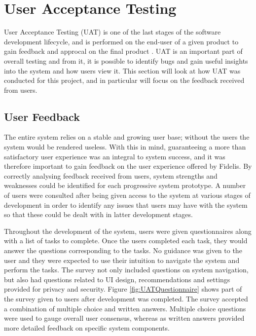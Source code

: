 \section{User Acceptance Testing}
User Acceptance Testing (UAT) is one of the last stages of the software development lifecycle, and is performed on the end-user of a given product to gain feedback and approcal on the final product \cite{EconomicTimes:UAT}. UAT is an important part of overall testing and from it, it is possible to identify bugs and gain useful insights into the system and how users view it. This section will look at how UAT was conducted for this project, and in particular will focus on the feedback received from users.

\subsection{User Feedback}
The entire system relies on a stable and growing user base; without the users the system would be rendered useless. With this in mind, guaranteeing a more than satisfactory user experience was an integral to system success, and it was therefore important to gain feedback on the user experience offered by Fidelis. By correctly analysing feedback received from users, system strengths and weaknesses could be identified for each progressive system prototype. A number of users were consulted after being given access to the system at various stages of development in order to identify any issues that users may have with the system so that these could be dealt with in latter development stages.

Throughout the development of the system, users were given questionnaires along with a list of tasks to complete. Once the users completed each task, they would answer the questions corresponding to the tasks. No guidance was given to the user and they were expected to use their intuition to navigate the system and perform the tasks. The survey not only included questions on system navigation, but also had questions related to UI design, recommendations and settings provided for privacy and security. Figure \ref{fig:UATQuestionnaire} shows part of the survey given to users after development was completed. The survey accepted a combination of multiple choice and written answers. Multiple choice questions were used to gauge overall user consensus, whereas as written answers provided more detailed feedback on specific system components.

